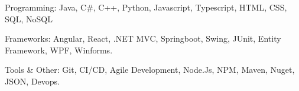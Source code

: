 \vspace{-1\baselineskip}
\begin{cvskills}
  \cvskill
    {Programming:} %
    {Java, C\#, C++, Python, Javascript, Typescript, HTML, CSS, SQL, NoSQL} %

  \cvskill
    {Frameworks:} %
    {Angular, React, .NET MVC, Springboot, Swing, JUnit, Entity Framework, WPF, Winforms.} %

  \cvskill
    {Tools \& Other:} %
    {Git, CI/CD, Agile Development, Node.Js, NPM, Maven, Nuget, JSON, Devops.} %

\end{cvskills}
\vspace{-0.5\baselineskip}
